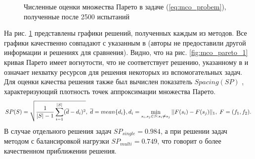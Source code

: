 \begin{figure}[ht]
    \centering
    \caption{Численные оценки множества Парето в задаче (\ref{eq:mco_probem}), полученные после 2500 испытаний}
    \label{fig:mco_pareto}
\end{figure}

На рис. \ref{fig:mco_pareto} представлены графики решений, полученных каждым из методов.
Все графики качественно совпадают с указанным в \cite{BinhKorn1999} (авторы не предоставили другой
информации и решениях для сравнения). Видно, что на рис. \ref{fig:mco_pareto_1}
кривая Парето имеет вогнутости, что не соответствует решению, указанному в \cite{BinhKorn1999} и
означает нехватку ресурсов для решения некоторых из вспомогательных задач.
Для оценки качества решения также был вычислен показатель \(Spacing(SP)\) \cite{RiquelmeLucken2015},
характеризующий плотность точек аппроксимации множества Парето.
\begin{displaymath}
  SP(S)=\sqrt{\frac{1}{|S|-1} \sum_{i=1}^{|S|} (\overline{d}-d_i)^2},
  \; \overline{d}=mean\{d_i\},
  \\d_i=\min_{s_i,s_j\in S:s_i\ne s_j}||F(s_i)-F(s_j)||_1,\; F=(f_1,f_2).
\end{displaymath}
В случае отдельного решения задач \(SP_{single}=0.984\), а при решении задач методом с балансировкой нагрузки
\(SP_{multi}=0.749\), что говорит о более качественном приближении решения.

